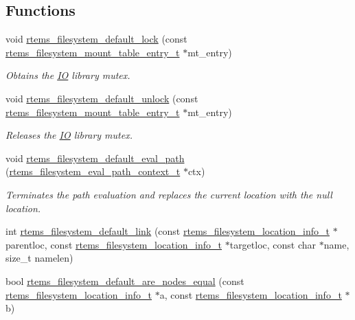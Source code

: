 \subsection*{Functions}
\begin{DoxyCompactItemize}
\item 
void \mbox{\hyperlink{group__LibIOFSOps_ga22adb86bb962a91df5c36619925c3a7b}{rtems\+\_\+filesystem\+\_\+default\+\_\+lock}} (const \mbox{\hyperlink{structrtems__filesystem__mount__table__entry__tt}{rtems\+\_\+filesystem\+\_\+mount\+\_\+table\+\_\+entry\+\_\+t}} $\ast$mt\+\_\+entry)
\begin{DoxyCompactList}\small\item\em Obtains the \mbox{\hyperlink{structIO}{IO}} library mutex. \end{DoxyCompactList}\item 
void \mbox{\hyperlink{group__LibIOFSOps_ga574786e949fa2835878995fe9c16db6c}{rtems\+\_\+filesystem\+\_\+default\+\_\+unlock}} (const \mbox{\hyperlink{structrtems__filesystem__mount__table__entry__tt}{rtems\+\_\+filesystem\+\_\+mount\+\_\+table\+\_\+entry\+\_\+t}} $\ast$mt\+\_\+entry)
\begin{DoxyCompactList}\small\item\em Releases the \mbox{\hyperlink{structIO}{IO}} library mutex. \end{DoxyCompactList}\item 
void \mbox{\hyperlink{group__LibIOFSOps_gaa070ca99adbec30122412347ccc634e7}{rtems\+\_\+filesystem\+\_\+default\+\_\+eval\+\_\+path}} (\mbox{\hyperlink{structrtems__filesystem__eval__path__context__t}{rtems\+\_\+filesystem\+\_\+eval\+\_\+path\+\_\+context\+\_\+t}} $\ast$ctx)
\begin{DoxyCompactList}\small\item\em Terminates the path evaluation and replaces the current location with the null location. \end{DoxyCompactList}\item 
int \mbox{\hyperlink{group__LibIOFSOps_gaf49aa8c3671b5c5282bb3f865b8e162a}{rtems\+\_\+filesystem\+\_\+default\+\_\+link}} (const \mbox{\hyperlink{group__LibIO_ga3252b3d31ee3c49ffff0b7604a676864}{rtems\+\_\+filesystem\+\_\+location\+\_\+info\+\_\+t}} $\ast$parentloc, const \mbox{\hyperlink{group__LibIO_ga3252b3d31ee3c49ffff0b7604a676864}{rtems\+\_\+filesystem\+\_\+location\+\_\+info\+\_\+t}} $\ast$targetloc, const char $\ast$name, size\+\_\+t namelen)
\item 
bool \mbox{\hyperlink{group__LibIOFSOps_ga590c632457e7ce877651d41bbb4c1bad}{rtems\+\_\+filesystem\+\_\+default\+\_\+are\+\_\+nodes\+\_\+equal}} (const \mbox{\hyperlink{group__LibIO_ga3252b3d31ee3c49ffff0b7604a676864}{rtems\+\_\+filesystem\+\_\+location\+\_\+info\+\_\+t}} $\ast$a, const \mbox{\hyperlink{group__LibIO_ga3252b3d31ee3c49ffff0b7604a676864}{rtems\+\_\+filesystem\+\_\+location\+\_\+info\+\_\+t}} $\ast$b)

\end{DoxyCompactItemize}
